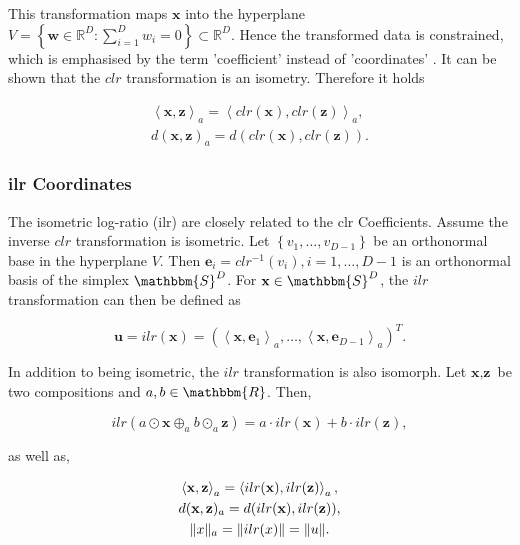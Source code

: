 This transformation maps $\textbf{x}$ into the hyperplane $V = \left\{\textbf{w} \in \mathbb{R}^D: \sum_{i=1}^D w_i=0\right\} \subset \mathbb{R}^D$. Hence the transformed data is constrained, which is emphasised by the term 'coefficient' instead of 'coordinates' \cite{Filzmoser:2020}. It can be shown that the $clr$ transformation is an isometry\cite{Egozcue:2003}. Therefore it holds 

\begin{gather}
\left\langle  \textbf{x},\textbf{z} \right\rangle_a = \left\langle  clr(\textbf{x}),clr(\textbf{z}) \right\rangle_a, \\
d(\textbf{x},\textbf{z})_a = d(clr(\textbf{x}),clr(\textbf{z})).
\label{eq:clr Coefficients isometric}
\end{gather}

\subsubsection{ilr Coordinates}
\label{sec:ilr Coordinates}

The isometric log-ratio (ilr) are closely related to the clr Coefficients. Assume the inverse $clr$ transformation is isometric. Let $\left\{v_1,\ldots,v_{D-1}\right\}$ be an orthonormal base in the hyperplane $V$. Then $\textbf{e}_i = clr^{-1}(v_i), i=1,\ldots,D-1$ is an orthonormal basis of the simplex $\mathbbm{S}^D$. For $\textbf{x} \in \mathbbm{S}^D$, the $ilr$ transformation can then be defined as \cite{Kynclova:2015}

\begin{equation}
\textbf{u} = ilr(\textbf{x}) = \left(\left\langle \textbf{x},\textbf{e}_1\right\rangle_a,\ldots,\left\langle \textbf{x},\textbf{e}_{D-1}\right\rangle_a\right)^T.
\label{eq:ilr Coordinates}
\end{equation}

In addition to being isometric, the $ilr$ transformation is also isomorph. Let $\textbf{x}, \textbf{z}$ be two compositions and $a, b  \in \mathbbm{R}$. Then,

\begin{equation}
ilr(a \odot \textbf{x} \oplus_a b \odot_a \textbf{z}) = a \cdot ilr(\textbf{x}) + b \cdot ilr(\textbf{z}),
\label{eq:ilr coordinates isomorph}
\end{equation}

as well as,

\begin{gather}
\left\langle  \textbf{x},\textbf{z} \right\rangle_a = \left\langle  ilr(\textbf{x}), ilr(\textbf{z}) \right\rangle_a, \\
d(\textbf{x},\textbf{z})_a = d(ilr(\textbf{x}),ilr(\textbf{z})),\\
\lVert x\rVert_a = \lVert ilr(x)\rVert = \lVert u\rVert.
\label{eq:ilr coordinates isometric }
\end{gather}


